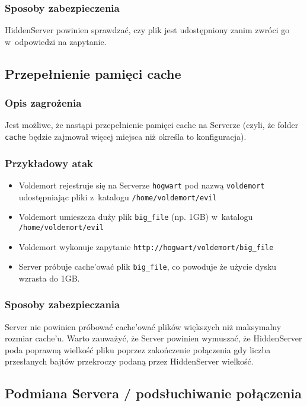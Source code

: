 \documentclass[a4paper,notitlepage]{article}
\begin{document}
\subsubsection*{Sposoby zabezpieczenia}
HiddenServer powinien sprawdzać, czy plik jest udostępniony zanim
zwróci go w~odpowiedzi na zapytanie.

\subsection{Przepełnienie pamięci cache}
\label{przepelnienieCacheu}
\subsubsection*{Opis zagrożenia}
Jest możliwe, że nastąpi przepełnienie pamięci cache na Serverze (czyli,
że folder \texttt{cache} będzie zajmował więcej miejsca niż określa to 
konfiguracja).
\subsubsection*{Przykładowy atak}
\begin{itemize}
\item Voldemort rejestruje się na Serverze \texttt{hogwart} pod nazwą
\texttt{voldemort} udostępniając pliki z~katalogu \texttt{/home/voldemort/evil}
\item Voldemort umieszcza duży plik \texttt{big\_file} (np. 1GB) 
w~katalogu \texttt{/home/voldemort/evil}
\item Voldemort wykonuje zapytanie \texttt{http://hogwart/voldemort/big\_file}
\item Server próbuje cache'ować plik \texttt{big\_file}, co powoduje że
użycie dysku wzrasta do 1GB.
\end{itemize}

\subsubsection*{Sposoby zabezpieczania}
Server nie powinien próbować cache'ować plików większych niż maksymalny
rozmiar cache'u. Warto zauważyć, że Server powinien wymuszać, że 
HiddenServer poda poprawną wielkość pliku poprzez zakończenie połączenia
gdy liczba przesłanych bajtów przekroczy podaną przez HiddenServer wielkość.

\subsection{Podmiana Servera / podsłuchiwanie połączenia}
\label{podmianaServera}
\end{document}
